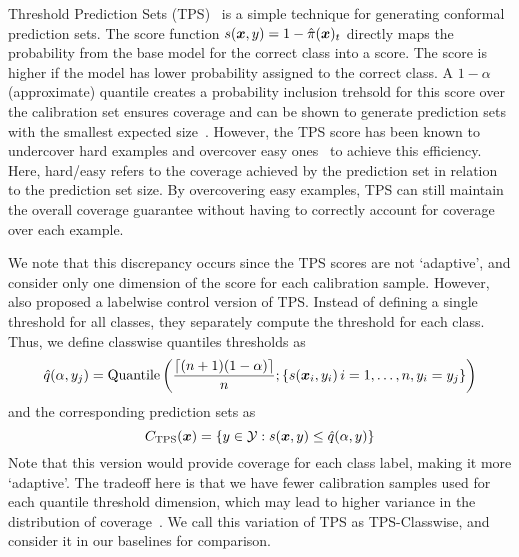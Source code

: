 Threshold Prediction Sets (TPS)~\citep{sadinle2019least} is a simple technique for generating conformal prediction sets.
The score function $s({\bm{x}}, y) = 1 - \hat{\pi}({\bm{x}})_t$ directly maps the probability from the base model for the correct class into a score.
The score is higher if the model has lower probability assigned to the correct class.
A $1-\alpha$ (approximate) quantile creates a probability inclusion trehsold for this score over the calibration set ensures coverage and can be shown to generate prediction sets with the smallest expected size~\cite{sadinle2019least}.
However, the TPS score has been known to undercover hard examples and overcover easy ones~\citep{angelopoulos2021uncertainty,zargarbashi23conformal} to achieve this efficiency.
Here, hard/easy refers to the coverage achieved by the prediction set in relation to the prediction set size.
By overcovering easy examples, TPS can still maintain the overall coverage guarantee without having to correctly account for coverage over each example.

We note that this discrepancy occurs since the TPS scores are not `adaptive', and consider only one dimension of the score for each calibration sample.
However, \citet{sadinle2019least} also proposed a labelwise control version of TPS.
Instead of defining a single threshold for all classes, they separately compute the threshold for each class.
Thus, we define classwise quantiles thresholds as
\[
    \hat{q}(\alpha, y_j) = \text{Quantile}\left(\frac{\lceil(n+1)(1-\alpha)\rceil}{n}; \{s({\bm{x}}_i, y_i)\, {i=1, \dots, n, y_i = y_j}\}\right)
\]
and the corresponding prediction sets as
\[
    C_{\text{TPS}}({\bm{x}}) = \{y \in {\mathcal{Y}}: s({\bm{x}}, y) \leq \hat{q}(\alpha, y)\}
\]
Note that this version would provide coverage for each class label, making it more `adaptive'.
The tradeoff here is that we have fewer calibration samples used for each quantile threshold dimension, which may lead to higher variance in the distribution of coverage~\cite{vovk2012conditional}.
We call this variation of TPS as TPS-Classwise, and consider it in our baselines for comparison.